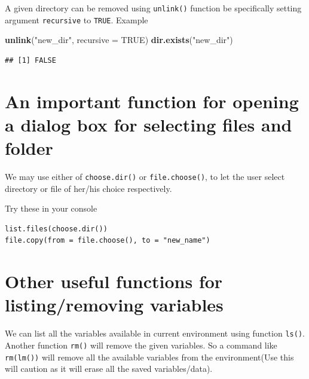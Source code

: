 \documentclass[
]{book}
\newenvironment{Shaded}{\begin{snugshade}}{\end{snugshade}}
\newcommand{\AttributeTok}[1]{\textcolor[rgb]{0.13,0.29,0.53}{#1}}
\newcommand{\ConstantTok}[1]{\textcolor[rgb]{0.56,0.35,0.01}{#1}}
\newcommand{\FunctionTok}[1]{\textcolor[rgb]{0.13,0.29,0.53}{\textbf{#1}}}
\newcommand{\NormalTok}[1]{#1}
\newcommand{\StringTok}[1]{\textcolor[rgb]{0.31,0.60,0.02}{#1}}
\begin{document}
A given directory can be removed using \texttt{unlink()} function be specifically setting argument \texttt{recursive} to \texttt{TRUE}. Example

\begin{Shaded}
\begin{Highlighting}[]
\FunctionTok{unlink}\NormalTok{(}\StringTok{"new\_dir"}\NormalTok{, }\AttributeTok{recursive =} \ConstantTok{TRUE}\NormalTok{)}
\FunctionTok{dir.exists}\NormalTok{(}\StringTok{"new\_dir"}\NormalTok{)}
\end{Highlighting}
\end{Shaded}

\begin{verbatim}
## [1] FALSE
\end{verbatim}

\hypertarget{an-important-function-for-opening-a-dialog-box-for-selecting-files-and-folder}{%
\section{An important function for opening a dialog box for selecting files and folder}\label{an-important-function-for-opening-a-dialog-box-for-selecting-files-and-folder}}

We may use either of \texttt{choose.dir()} or \texttt{file.choose()}, to let the user select directory or file of her/his choice respectively.

Try these in your console

\begin{verbatim}
list.files(choose.dir())
file.copy(from = file.choose(), to = "new_name")
\end{verbatim}

\hypertarget{other-useful-functions-for-listingremoving-variables}{%
\section{Other useful functions for listing/removing variables}\label{other-useful-functions-for-listingremoving-variables}}

We can list all the variables available in current environment using function \texttt{ls()}. Another function \texttt{rm()} will remove the given variables. So a command like \texttt{rm(lm())} will remove all the available variables from the environment(Use this will caution as it will erase all the saved variables/data).
\end{document}
